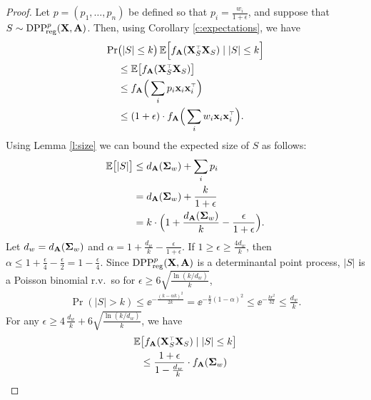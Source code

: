 \documentclass[thesis.tex]{subfiles}
\begin{document}
\begin{proof}
  Let $p=(p_1,\dots,p_n)$ be defined so that $p_i =
  \frac{w_i}{1+\epsilon}$, and suppose that $S\sim
  {{\mathrm{DPP}}_{\!\mathrm{reg}}^{p}}(\mathbf X,\mathbf A)$. Then, using Corollary \ref{c:expectations}, we have
  \begin{align*}
\Pr&\big(|S|\leq k\big)\,\E\Big[f_{\A}(\X_S^\top\X_S)\mid |S|\leq k\Big]\\
&\leq
\E\big[f_{\A}(\X_S^\top\X_S)\big] \\
&\leq
f_{\A}\Big(\sum_ip_i\x_i\x_i^\top\Big)
\\ &\leq (1+\epsilon)\cdot f_{\A}\Big(\sum_iw_i\x_i\x_i^\top\Big).
  \end{align*}
  Using Lemma \ref{l:size} we can bound the expected size of $S$ as
follows:
\begin{align*}
  \mathbb E\big[|S|\big]
  &\leq d_{\mathbf A}(\mathbf{\Sigma}_w) + \sum_i p_i \\
  &=d_{\mathbf A}(\mathbf{\Sigma}_w)+\frac{k}{1+\epsilon}\\
  &=k\cdot \Big(1+\frac {d_{\mathbf A}(\mathbf{\Sigma}_w) }k - \frac{\epsilon}{1+\epsilon}\Big).
\end{align*}
Let $d_w = d_{\mathbf A}(\mathbf{\Sigma}_w)$ and $\alpha=1+\frac {d_w} k -\frac{\epsilon}{1+\epsilon}$.
If $1\geq\epsilon\geq \frac{4d_w}{k}$, then $\alpha\leq 1 +
\frac\epsilon4-\frac\epsilon2=1-\frac\epsilon4$. Since ${{\mathrm{DPP}}_{\!\mathrm{reg}}^{p}}(\mathbf X,\mathbf A)$
is a  determinantal point process, $|S|$ is a
Poisson binomial r.v.~so for $\epsilon\geq 6\sqrt{\frac{\ln(k/d_w)}{k}}$,
\begin{align*}
  \Pr(|S|>k) \leq \ee^{-\frac{(k-\alpha k)^2}{2k}} = \ee^{-\frac
  k2(1-\alpha)^2}\leq \ee^{-\frac{k\epsilon^2}{32}}\leq \frac{d_w}k.
\end{align*}
For any $\epsilon\geq
4\,\frac{d_w}k + 6\sqrt{\frac{\ln(k/d_w)}{k}}$, we have
\begin{align*}
\E&\big[f_{\A}(\X_S^\top\X_S)\mid |S|\leq k\big] \\
&\leq \frac{1+\epsilon}{1-\frac{d_w}k}\cdot f_{\A}(\Sigmab_w)\\

\end{align*}
\end{proof}
\end{document}
